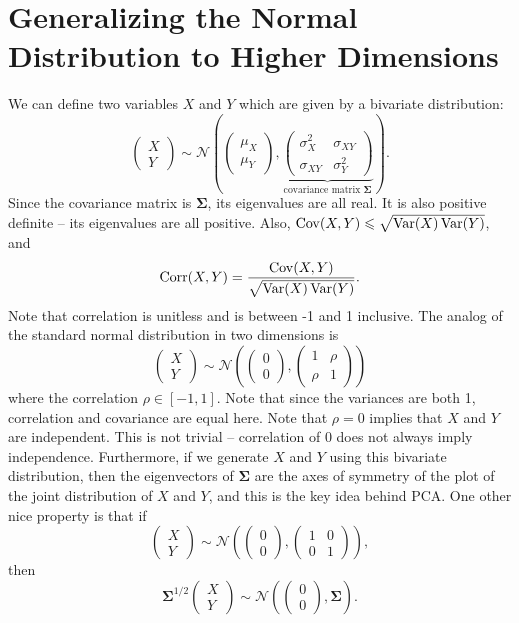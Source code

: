 \section{Generalizing the Normal Distribution to Higher Dimensions}
We can define two variables $X$ and $Y$ which are given by a bivariate distribution: $$ \begin{pmatrix} X \\ Y \end{pmatrix} \sim \mathcal N\left(\begin{pmatrix} \mu_X \\ \mu_Y \end{pmatrix},\underbrace{\begin{pmatrix} \sigma_X^2 & \sigma_{XY} \\ \sigma_{XY} & \sigma_Y^2 \end{pmatrix}}_{\text{covariance matrix }\mathbf\Sigma}\right). $$ Since the covariance matrix is $\mathbf\Sigma$, its eigenvalues are all real. It is also positive definite -- its eigenvalues are all positive. Also, $\operatorname{Cov}(X,Y)\leqslant\sqrt{\operatorname{Var}(X)\operatorname{Var}(Y)}$, and $$ \operatorname{Corr}(X,Y)=\frac{\operatorname{Cov}(X,Y)}{\sqrt{\operatorname{Var}(X)\operatorname{Var}(Y)}}. $$ Note that correlation is unitless and is between -1 and 1 inclusive. The analog of the standard normal distribution in two dimensions is $$ \begin{pmatrix} X \\ Y \end{pmatrix}\sim\mathcal N\left(\begin{pmatrix} 0 \\ 0 \end{pmatrix},\begin{pmatrix} 1 & \rho \\ \rho & 1 \end{pmatrix}\right) $$ where the correlation $\rho\in[-1,1]$. Note that since the variances are both 1, correlation and covariance are equal here. Note that $\rho=0$ implies that $X$ and $Y$ are independent. This is not trivial -- correlation of 0 does not always imply independence. Furthermore, if we generate $X$ and $Y$ using this bivariate distribution, then the eigenvectors of $\mathbf\Sigma$ are the axes of symmetry of the plot of the joint distribution of $X$ and $Y$, and this is the key idea behind PCA. One other nice property is that if $$ \begin{pmatrix} X \\ Y \end{pmatrix}\sim\mathcal N\left(\begin{pmatrix} 0 \\ 0 \end{pmatrix}, \begin{pmatrix} 1 & 0 \\ 0 & 1 \end{pmatrix}\right), $$ then $$ \mathbf\Sigma^{1/2} \begin{pmatrix} X \\ Y \end{pmatrix}\sim\mathcal N\left(\begin{pmatrix} 0 \\ 0 \end{pmatrix}, \mathbf\Sigma\right). $$

